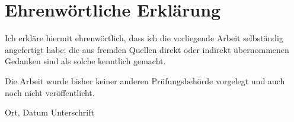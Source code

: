 \documentclass[12pt]{article}
\begin{document}
	\section*{Ehrenwörtliche Erklärung}
	
	Ich erkläre hiermit ehrenwörtlich, dass ich die vorliegende Arbeit selbständig angefertigt habe; die aus fremden Quellen direkt oder indirekt übernommenen Gedanken sind als solche kenntlich gemacht.
	\par \bigskip
	\noindent Die Arbeit wurde bisher keiner anderen Prüfungsbehörde vorgelegt und auch noch nicht veröffentlicht.
	
	\vspace{4cm}
	
	\hspace{2cm} Ort, Datum \hfill Unterschrift \hspace{2cm}
	\pagebreak
\end{document}
